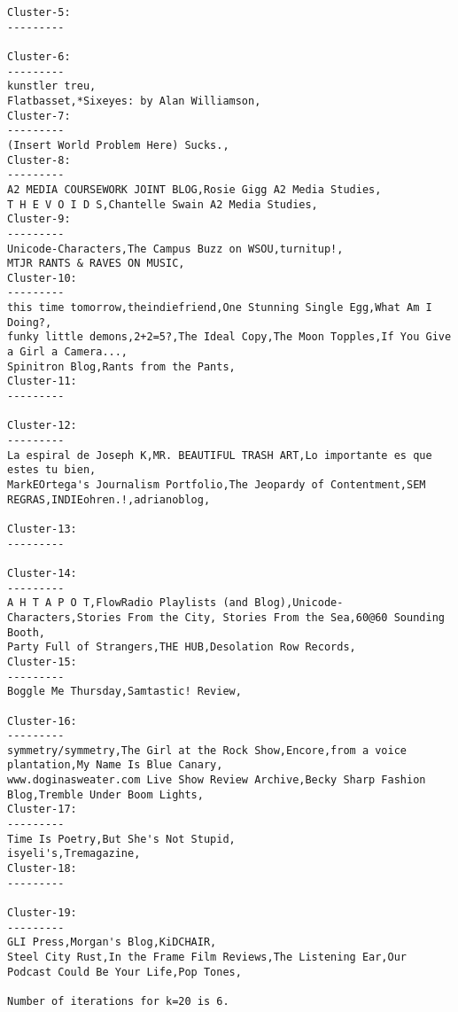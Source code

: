 \begin{lstlisting}[style=nonumbers, keywords={select, from, where, limit, and}]
Cluster-5:
---------

Cluster-6:
---------
kunstler treu,
Flatbasset,*Sixeyes: by Alan Williamson,
Cluster-7:
---------
(Insert World Problem Here) Sucks.,
Cluster-8:
---------
A2 MEDIA COURSEWORK JOINT BLOG,Rosie Gigg A2 Media Studies,
T H E V O I D S,Chantelle Swain A2 Media Studies,
Cluster-9:
---------
Unicode-Characters,The Campus Buzz on WSOU,turnitup!,
MTJR RANTS & RAVES ON MUSIC,
Cluster-10:
---------
this time tomorrow,theindiefriend,One Stunning Single Egg,What Am I Doing?,
funky little demons,2+2=5?,The Ideal Copy,The Moon Topples,If You Give a Girl a Camera...,
Spinitron Blog,Rants from the Pants,
Cluster-11:
---------

Cluster-12:
---------
La espiral de Joseph K,MR. BEAUTIFUL TRASH ART,Lo importante es que estes tu bien,
MarkEOrtega's Journalism Portfolio,The Jeopardy of Contentment,SEM REGRAS,INDIEohren.!,adrianoblog,

Cluster-13:
---------

Cluster-14:
---------
A H T A P O T,FlowRadio Playlists (and Blog),Unicode-Characters,Stories From the City, Stories From the Sea,60@60 Sounding Booth,
Party Full of Strangers,THE HUB,Desolation Row Records,
Cluster-15:
---------
Boggle Me Thursday,Samtastic! Review,

Cluster-16:
---------
symmetry/symmetry,The Girl at the Rock Show,Encore,from a voice plantation,My Name Is Blue Canary,
www.doginasweater.com Live Show Review Archive,Becky Sharp Fashion Blog,Tremble Under Boom Lights,
Cluster-17:
---------
Time Is Poetry,But She's Not Stupid,
isyeli's,Tremagazine,
Cluster-18:
---------

Cluster-19:
---------
GLI Press,Morgan's Blog,KiDCHAIR,
Steel City Rust,In the Frame Film Reviews,The Listening Ear,Our Podcast Could Be Your Life,Pop Tones,

Number of iterations for k=20 is 6.
\end{lstlisting}